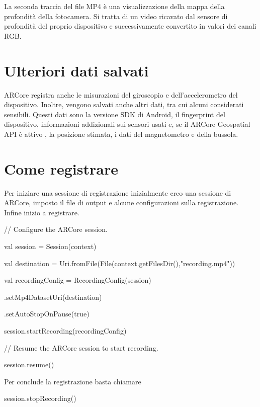 \documentclass[crop=false, class=book]{standalone}
\begin{document}
La seconda traccia del file MP4 è una visualizzazione della mappa della profondità della fotocamera. Si tratta di un video ricavato dal sensore di profondità del proprio dispositivo e successivamente convertito in valori dei canali RGB.

\section{Ulteriori dati salvati}
 ARCore registra anche le misurazioni del giroscopio e dell’accelerometro del dispositivo. Inoltre, vengono salvati anche altri dati, tra cui alcuni considerati sensibili. Questi dati sono la versione SDK di Android, il fingerprint del dispositivo, informazioni addizionali sui sensori usati e, se il ARCore Geospatial API è attivo , la posizione stimata, i dati del magnetometro e della bussola.
 
 \section{Come registrare}
 
 Per iniziare una sessione di registrazione inizialmente creo una sessione di ARCore, imposto il file di output e alcune configurazioni sulla registrazione. Infine inizio a registrare.
 
 \begin{center}
	\begin{minipage}{0.95\textwidth}
 
// Configure the ARCore session.

val session = Session(context)

val destination = Uri.fromFile(File(context.getFilesDir(),"recording.mp4"))

val recordingConfig = RecordingConfig(session)

  .setMp4DatasetUri(destination)
  
  .setAutoStopOnPause(true)
  
session.startRecording(recordingConfig)


// Resume the ARCore session to start recording.

session.resume()

\end{minipage}
\end{center}


Per conclude la registrazione basta chiamare

 \begin{center}
	\begin{minipage}{0.95\textwidth}
session.stopRecording()

\end{minipage}
\end{center}
\end{document}

